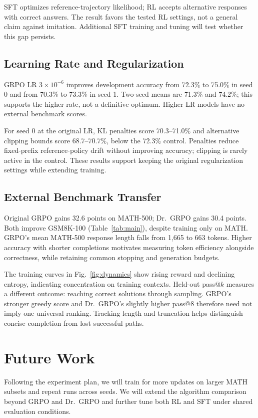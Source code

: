 \documentclass[conference]{IEEEtran}
\begin{document}
SFT optimizes reference-trajectory likelihood; RL accepts alternative responses with correct answers. The result favors the tested RL settings, not a general claim against imitation. Additional SFT training and tuning will test whether this gap persists.

\subsection{Learning Rate and Regularization}
GRPO LR $3\times10^{-6}$ improves development accuracy from 72.3\% to 75.0\% in seed 0 and from 70.3\% to 73.3\% in seed 1. Two-seed means are 71.3\% and 74.2\%; this supports the higher rate, not a definitive optimum. Higher-LR models have no external benchmark scores.

For seed 0 at the original LR, KL penalties score 70.3--71.0\% and alternative clipping bounds score 68.7--70.7\%, below the 72.3\% control. Penalties reduce fixed-prefix reference-policy drift without improving accuracy; clipping is rarely active in the control. These results support keeping the original regularization settings while extending training.

\subsection{External Benchmark Transfer}
Original GRPO gains 32.6 points on MATH-500; Dr.~GRPO gains 30.4 points. Both improve GSM8K-100 (Table~\ref{tab:main}), despite training only on MATH. GRPO's mean MATH-500 response length falls from 1,665 to 663 tokens. Higher accuracy with shorter completions motivates measuring token efficiency alongside correctness, while retaining common stopping and generation budgets.

The training curves in Fig.~\ref{fig:dynamics} show rising reward and declining entropy, indicating concentration on training contexts. Held-out pass@$k$ measures a different outcome: reaching correct solutions through sampling. GRPO's stronger greedy score and Dr.~GRPO's slightly higher pass@8 therefore need not imply one universal ranking. Tracking length and truncation helps distinguish concise completion from lost successful paths.

\section{Future Work}
Following the experiment plan, we will train for more updates on larger MATH subsets and repeat runs across seeds. We will extend the algorithm comparison beyond GRPO and Dr.~GRPO and further tune both RL and SFT under shared evaluation conditions.
\end{document}
